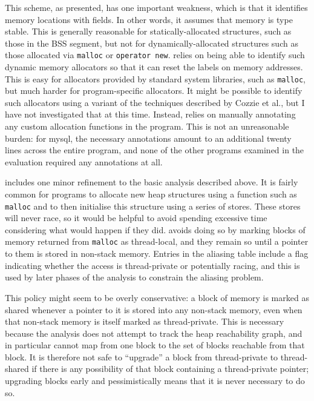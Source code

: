 {This scheme, as presented, has one important weakness, which is that
it identifies memory locations with fields.  In other words, it
assumes that memory is type stable\cite{Greenwald1996}.  This is
generally reasonable for statically-allocated structures, such as
those in the BSS segment\cite[Section~7.6]{Stevens}, but not for
dynamically-allocated structures such as those allocated via
\texttt{malloc} or \texttt{operator new}.  {\Implementation} relies on being able to identify
such dynamic memory allocators so that it can reset the labels on
memory addresses.  This is easy for allocators provided by standard
system libraries, such as \texttt{malloc}, but much harder for
program-specific allocators.  It might be possible to identify such
allocators using a variant of the techniques described by Cozzie et
al.\cite{Cozzie2008}, but I have not investigated that at this time.
Instead, {\implementation} relies on manually annotating any custom
allocation functions in the program.  This is not an unreasonable
burden: for mysql, the necessary annotations amount to an additional
twenty lines across the entire program, and none of the other programs
examined in the evaluation required any annotations at all.

{\Implementation} includes one minor refinement to the basic analysis
described above.  It is fairly common for programs to allocate new
heap structures using a function such as \texttt{malloc} and to then
initialise this structure using a series of stores.  These stores will
never race, so it would be helpful to avoid spending excessive time
considering what would happen if they did.  {\Technique} avoids doing
so by marking blocks of memory returned from \texttt{malloc} as
thread-local, and they remain so until a pointer to them is stored in
non-stack memory.  Entries in the aliasing table include a flag
indicating whether the access is thread-private or potentially racing,
and this is used by later phases of the analysis to constrain the
aliasing problem.

This policy might seem to be overly conservative: a block of memory is
marked as shared whenever a pointer to it is stored into any non-stack
memory, even when that non-stack memory is itself marked as
thread-private.  This is necessary because the analysis does not
attempt to track the heap reachability graph, and in particular cannot
map from one block to the set of blocks reachable from that block.  It
is therefore not safe to ``upgrade'' a block from thread-private to
thread-shared if there is any possibility of that block containing a
thread-private pointer; upgrading blocks early and pessimistically
means that it is never necessary to do so.

}
